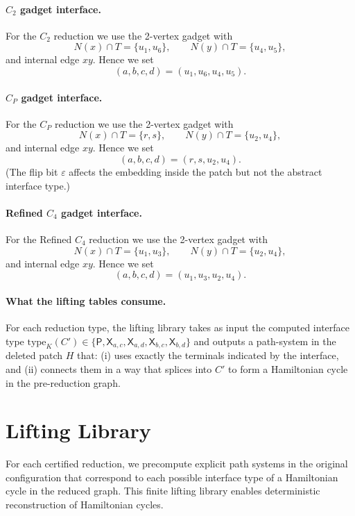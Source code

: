 \documentclass[12pt]{article}
\theoremstyle{definition}
\newcommand{\RefinedCFourGadgetVertices}{2}
\newcommand{\CtwoGadgetVertices}{2}
\newcommand{\PinchGadgetVertices}{2}
\begin{document}
\paragraph{$C_2$ gadget interface.}
For the $C_2$ reduction we use the \CtwoGadgetVertices-vertex gadget with
\[
N(x)\cap T=\{u_1,u_6\},\qquad N(y)\cap T=\{u_4,u_5\},
\]
and internal edge $xy$. Hence we set
\[
(a,b,c,d)=(u_1,u_6,u_4,u_5).
\]

\paragraph{$C_P$ gadget interface.}
For the $C_P$ reduction we use the \PinchGadgetVertices-vertex gadget with
\[
N(x)\cap T=\{r,s\},\qquad N(y)\cap T=\{u_2,u_4\},
\]
and internal edge $xy$. Hence we set
\[
(a,b,c,d)=(r,s,u_2,u_4).
\]
(The flip bit $\varepsilon$ affects the embedding inside the patch but not the abstract interface type.)

\paragraph{Refined $C_4$ gadget interface.}
For the Refined $C_4$ reduction we use the \RefinedCFourGadgetVertices-vertex gadget with
\[
N(x)\cap T=\{u_1,u_3\},\qquad N(y)\cap T=\{u_2,u_4\},
\]
and internal edge $xy$. Hence we set
\[
(a,b,c,d)=(u_1,u_3,u_2,u_4).
\]

\paragraph{What the lifting tables consume.}
For each reduction type, the lifting library takes as input the computed
interface type $\mathrm{type}_K(C')\in\{\mathsf{P},\mathsf{X}_{a,c},
\mathsf{X}_{a,d},\mathsf{X}_{b,c},\mathsf{X}_{b,d}\}$ and outputs a path-system
in the deleted patch $H$ that:
(i) uses exactly the terminals indicated by the interface, and
(ii) connects them in a way that splices into $C'$ to form a Hamiltonian cycle in
the pre-reduction graph.

\section{Lifting Library}
\label{sec:lifting-library}

For each certified reduction, we precompute explicit path systems in the original configuration that correspond to each possible interface type of a Hamiltonian cycle in the reduced graph. This finite lifting library enables deterministic reconstruction of Hamiltonian cycles.
\end{document}
